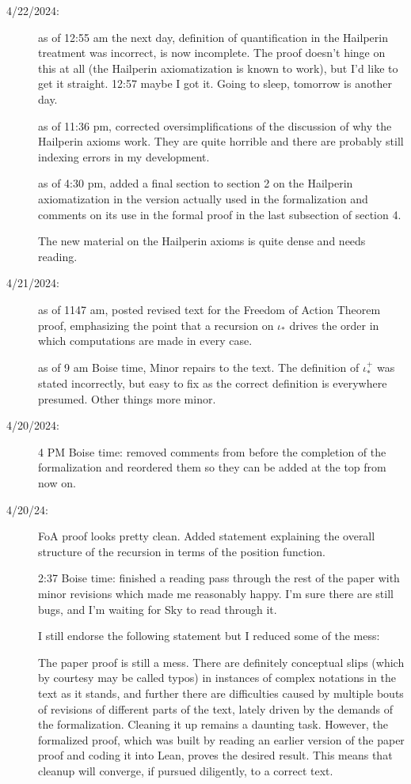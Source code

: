 \documentclass[112pt]{article}
\begin{document}
\begin{description}
\item[4/22/2024:]  

as of 12:55 am the next day, definition of quantification in the Hailperin treatment was incorrect, is now incomplete.  The proof doesn't hinge on this at all (the Hailperin axiomatization is known to work), but I'd like to get it straight.  12:57 maybe I got it.  Going to sleep, tomorrow is another day.

as of 11:36 pm, corrected oversimplifications of the discussion of why the Hailperin axioms work.  They are quite horrible and there are probably still indexing errors in my development.

as of 4:30 pm, added a final section to section 2 on the Hailperin axiomatization in the version actually used in the formalization and comments on its use in the formal proof in the last subsection of section 4.

The new material on the Hailperin axioms is quite dense and needs reading.



\item[4/21/2024:]  as of 1147 am, posted revised text for the Freedom of Action Theorem proof, emphasizing the point that a recursion on $\iota_*$ drives the order in which computations are made in every case.

as of 9 am Boise time, Minor repairs to the text.  The definition of $\iota_*^+$ was stated incorrectly, but easy to fix as the correct definition is everywhere presumed.  Other things more minor.

\item[4/20/2024:] 4 PM Boise time:  removed comments from before the completion of the formalization and reordered them so they can be added at the top from now on.

\item[4/20/24:]  FoA proof looks pretty clean.  Added statement explaining the overall structure of the recursion in terms of the position function.

2:37 Boise time:  finished a reading pass through the rest of the paper with minor revisions which made me reasonably happy.  I'm sure there are still bugs, and I'm waiting for Sky to read through it.

I still endorse the following statement but I reduced some of the mess:

The paper proof is still a mess.  There are definitely conceptual slips (which by courtesy may be called typos) in instances of complex notations in the text as it stands, and further there are difficulties caused by multiple bouts of revisions of different parts of the text, lately driven by the demands of the formalization.
Cleaning it up remains a daunting task.  However, the formalized proof, which was built by reading an earlier version of the paper proof and coding it into Lean, proves the desired result.  This means that cleanup will converge, if pursued diligently, to a correct text.


\end{description}
\end{document}
